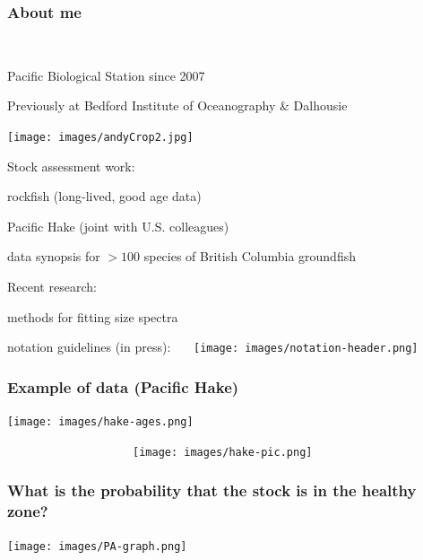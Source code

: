 \begin{frame}
\frametitle{About me}
~\\

\begin{minipage}{12cm}
\bi
  \item Pacific Biological Station since 2007
  \item Previously at Bedford Institute of Oceanography \& Dalhousie
\ei
\end{minipage}
\begin{minipage}{2cm}
  \texttt{[image: images/andyCrop2.jpg]}
\end{minipage}

\bi
  \item Stock assessment work:
    \bi
    \item rockfish (long-lived, good age data)
    \item Pacific Hake (joint with U.S. colleagues)
    \item data synopsis for $>100$ species of British Columbia groundfish
  \ei
  \item Recent research:
  \bi
    \item methods for fitting size spectra
    \item notation guidelines (in press):
  \ei
\ei
\medskip
\pause
~~~\texttt{[image: images/notation-header.png]}
\end{frame}


\begin{frame}
\frametitle{Example of data (Pacific Hake)}


\begin{minipage}{8cm}
\texttt{[image: images/hake-ages.png]}
\end{minipage}
\begin{minipage}{5cm}
~~~~~~~~~~~~~~~~~~~~\texttt{[image: images/hake-pic.png]}
\end{minipage}

\end{frame}


\begin{frame}
\frametitle{What is the probability that the stock is in the healthy zone?}

\centering
\texttt{[image: images/PA-graph.png]}

\end{frame}

